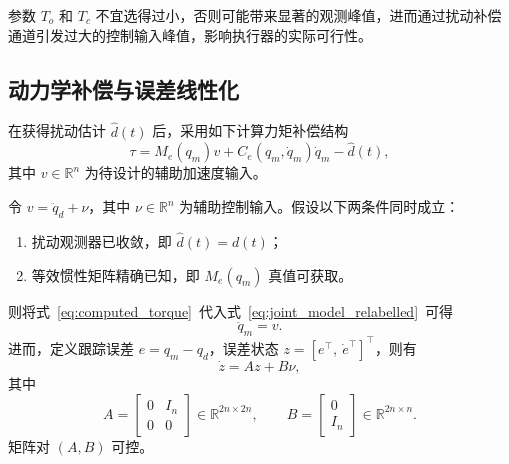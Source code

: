 \begin{remark}[观测器参数的实用选取]
  参数 \(T_o\) 和 \(T_c\) 不宜选得过小，否则可能带来显著的观测峰值，进而通过扰动补偿通道引发过大的控制输入峰值，影响执行器的实际可行性。
\end{remark}

\subsection{动力学补偿与误差线性化}
\label{sec:compensation}

在获得扰动估计 \(\hat d(t)\) 后，采用如下计算力矩补偿结构
\begin{equation}
\tau = M_e(q_m)v + C_e(q_m,\dot q_m)\dot q_m - \hat d(t),
\label{eq:computed_torque}
\end{equation}
其中 \(v\in\mathbb R^n\) 为待设计的辅助加速度输入。

\begin{lemma}[误差通道线性化]\label{lem:linearization}
  令 \(v = \ddot q_d + \nu\)，其中 \(\nu\in\mathbb R^n\) 为辅助控制输入。假设以下两条件同时成立：
  \begin{enumerate}
    \item[(C1)] 扰动观测器已收敛，即 \(\hat d(t) = d(t)\)；
    \item[(C2)] 等效惯性矩阵精确已知，即 \(M_e(q_m)\) 真值可获取。
  \end{enumerate}
  则将式~\eqref{eq:computed_torque}~代入式~\eqref{eq:joint_model_relabelled}~可得
  \begin{equation}
  \ddot q_m = v.
  \label{eq:double_integrator}
  \end{equation}
  进而，定义跟踪误差 \(e = q_m - q_d\)，误差状态 \(z = [e^\top,\ \dot e^\top]^\top\)，则有
  \begin{equation}
  \dot z = A z + B\nu,
  \label{eq:linear_error}
  \end{equation}
  其中
  \begin{equation}
  A = \begin{bmatrix} 0 & I_n \\ 0 & 0 \end{bmatrix} \in\mathbb R^{2n\times2n},\qquad
  B = \begin{bmatrix} 0 \\ I_n \end{bmatrix} \in\mathbb R^{2n\times n}.
  \label{eq:ab_matrices}
  \end{equation}
  矩阵对 \((A,B)\) 可控。
\end{lemma}

